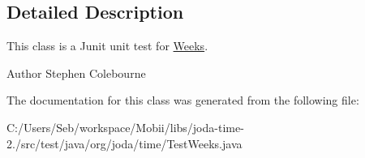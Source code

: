 \subsection{Detailed Description}
This class is a Junit unit test for \hyperlink{classorg_1_1joda_1_1time_1_1_weeks}{Weeks}.

\begin{DoxyAuthor}{Author}
Stephen Colebourne 
\end{DoxyAuthor}


The documentation for this class was generated from the following file\-:\begin{DoxyCompactItemize}
\item 
C\-:/\-Users/\-Seb/workspace/\-Mobii/libs/joda-\/time-\/2./src/test/java/org/joda/time/Test\-Weeks.\-java\end{DoxyCompactItemize}
